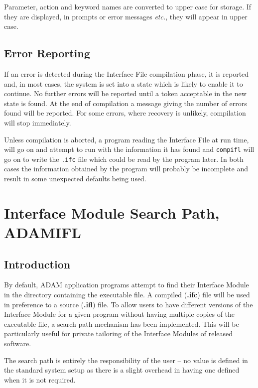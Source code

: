 \documentclass[twoside,11pt]{article}
\newcommand{\xlabel}[1]{}
\renewcommand{\_}{\texttt{\symbol{95}}}
\begin{document}
Parameter, action and keyword names are converted to upper case for storage.
If they are displayed, in prompts or error messages {\em etc.}, they will
appear in upper case.

\subsection{Error Reporting\xlabel{error_reporting}}

If an error is detected during the Interface File compilation phase, it is 
reported and, in most cases, the system is set into a state which is likely 
to enable it to continue. 
No further errors will be reported until a token acceptable in the new state
is found. At the end of compilation a message giving the number of errors
found will be reported.
For some errors, where recovery is unlikely, compilation will stop immediately.

Unless compilation is aborted, a program reading the Interface File at run
time, will go on and attempt to run with the information it has found and
\texttt{compifl} will go on to write the \texttt{.ifc} file which could be read
by the program later.
In both cases the information obtained by the program will probably be 
incomplete and result in some unexpected defaults being used.

\newpage

\section{Interface Module Search Path, ADAM\_IFL
\xlabel{interface_module_search_path}\label{searchpath}}

\subsection{Introduction\xlabel{introduction3}}

By default, ADAM application programs  attempt to find their Interface Module 
in the directory containing the executable file. A compiled ({\bf .ifc}) file
will be used in preference to a source ({\bf .ifl}) file.
To allow users to have different versions of the Interface Module for a given
program without having multiple copies of the executable file, a search path 
mechanism has been implemented. 
This will be particularly useful for private tailoring of the Interface 
Modules of released software.

The search path is entirely the responsibility of the user --
no value is defined in the standard system setup as there is a slight overhead
in having one defined when it is not required.
\end{document}
